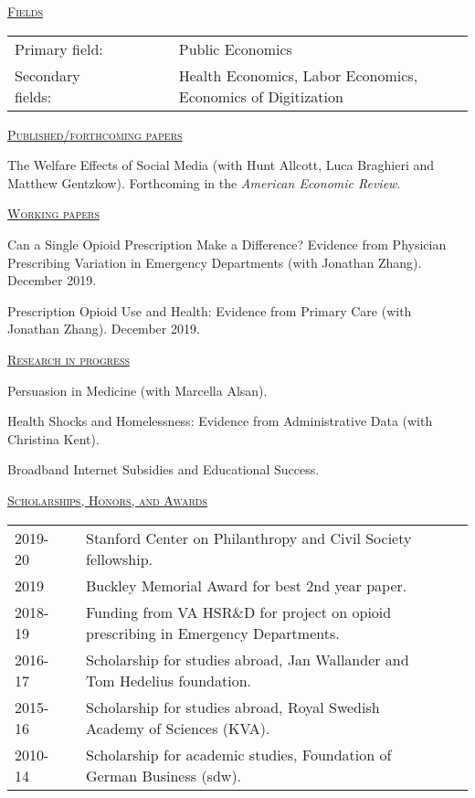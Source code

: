 \documentclass[letterpaper,11pt]{article}
\begin{document}
\underline {\textsc{Fields}}

\noindent\begin{tabular}{@{}l@{}lll@{}cl}
Primary field: &&&&& Public Economics \\
Secondary fields: &&&&& Health Economics, Labor Economics, Economics of Digitization
\end{tabular}


\bigskip
 
 
 \underline {\textsc{Published/forthcoming papers}}
 
The Welfare Effects of Social Media (with Hunt Allcott, Luca Braghieri and Matthew Gentzkow). Forthcoming in the \textit{American Economic Review}.

\medskip

\underline {\textsc{Working papers}}

Can a Single Opioid Prescription Make a Difference? Evidence from Physician Prescribing Variation in Emergency Departments (with Jonathan Zhang). December 2019.

Prescription Opioid Use and Health: Evidence from Primary Care (with Jonathan Zhang). December 2019.


\medskip


\underline {\textsc{Research in progress}}

Persuasion in Medicine (with Marcella Alsan).

Health Shocks and Homelessness: Evidence from Administrative Data (with Christina Kent).

Broadband Internet Subsidies and Educational Success.



\newpage
 
\underline {\textsc{Scholarships, Honors, and Awards}}

\begin{tabular}{@{}l@{}cl@{}cl}
2019-20 & & Stanford Center on Philanthropy and Civil Society fellowship. \\
2019 & & Buckley Memorial Award for best 2nd year paper. \\
2018-19 & & Funding from VA HSR\&D for project on opioid prescribing in Emergency Departments. \\
2016-17 & & Scholarship for studies abroad, Jan Wallander and Tom Hedelius foundation. \\
2015-16 & & Scholarship for studies abroad, Royal Swedish Academy of Sciences (KVA).  \\
2010-14 & & Scholarship for academic studies, Foundation of German Business (sdw).
\end{tabular}
 
\end{document}
